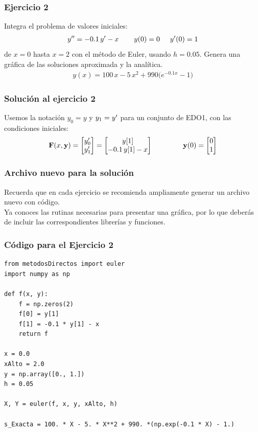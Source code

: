 \documentclass[12pt]{beamer}
\begin{document}
\begin{frame}
\frametitle{Ejercicio 2}
Integra el problema de valores iniciales:
\begin{align*}
{y}^{\prime \prime} = -0.1 \, {y}^{\prime} - x \hspace{0.75cm} y (0) = 0 \hspace{0.5cm} {y}^{\prime} (0) = 1
\end{align*}
de $x = 0$ hasta $x = 2$ con el método de Euler, usando $h = 0.05$. Genera una gráfica de las soluciones aproximada y la analítica.
\pause
\begin{align*}
y (x) = 100 \, x - 5 \, x^{2} + 990 \big( e^{-0.1 x} - 1 \big)
\end{align*}
\end{frame}
\begin{frame}
\frametitle{Solución al ejercicio 2}
Usemos la notación $y_{0} = y$ y $y_{1} = {y}^{\prime}$ para un conjunto de EDO1, con las condiciones iniciales:
\pause
\begin{align*}
\mathbf{F} (x, \mathbf{y}) = \begin{bmatrix}
{y}^{\prime}_{0} \\
{y}^{\prime}_{1}
\end{bmatrix}
=
\begin{bmatrix}
y[1] \\
-0.1 \, y[1] - x
\end{bmatrix}
\hspace{1.5cm}
\mathbf{y} (0) =
\begin{bmatrix}
0 \\
1
\end{bmatrix}
\end{align*}
\end{frame}
\begin{frame}
\frametitle{Archivo nuevo para la solución}
Recuerda que en cada ejercicio se recomienda ampliamente generar un archivo nuevo con código.
\\
\bigskip
\pause
Ya conoces las rutinas necesarias para presentar una gráfica, por lo que deberás de incluir las correspondientes librerías y funciones.
\end{frame}
\begin{frame}
\frametitle{Código para el Ejercicio 2}
\begin{lstlisting}[caption=Código para resolver el ejercicio con el método de Euler]
from metodosDirectos import euler
import numpy as np

def f(x, y):
	f = np.zeros(2)
	f[0] = y[1]
	f[1] = -0.1 * y[1] - x
	return f

x = 0.0
xAlto = 2.0
y = np.array([0., 1.])
h = 0.05

X, Y = euler(f, x, y, xAlto, h)

s_Exacta = 100. * X - 5. * X**2 + 990. *(np.exp(-0.1 * X) - 1.)
\end{lstlisting}
\end{frame}
\end{document}
